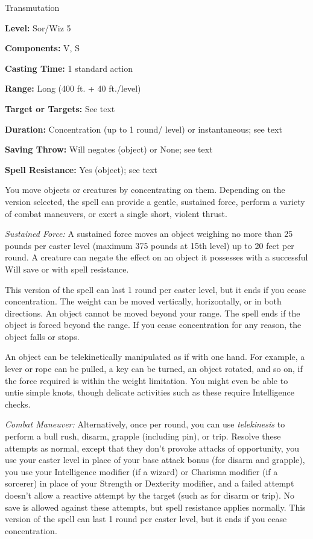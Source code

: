
Transmutation

\textbf{Level:} Sor/Wiz 5

\textbf{Components:} V, S

\textbf{Casting Time:} 1 standard action

\textbf{Range:} Long (400 ft. + 40 ft./level)

\textbf{Target or Targets:} See text

\textbf{Duration:} Concentration (up to 1 round/ level) or instantaneous; see text

\textbf{Saving Throw:} Will negates (object) or None; see text

\textbf{Spell Resistance:} Yes (object); see text

You move objects or creatures by concentrating on them. Depending on the version 
selected, the spell can provide a gentle, sustained force, perform a variety of 
combat maneuvers, or exert a single short, violent thrust.

\textit{Sustained Force:} A sustained force moves an object weighing no more than 
25 pounds per caster level (maximum 375 pounds at 15th level) up to 20 feet per 
round. A creature can negate the effect on an object it possesses with a successful 
Will save or with spell resistance.

This version of the spell can last 1 round per caster level, but it ends if you 
cease concentration. The weight can be moved vertically, horizontally, or in both 
directions. An object cannot be moved beyond your range. The spell ends if the 
object is forced beyond the range. If you cease concentration for any reason, the 
object falls or stops.

An object can be telekinetically manipulated as if with one hand. For example, 
a lever or rope can be pulled, a key can be turned, an object rotated, and so on, 
if the force required is within the weight limitation. You might even be able to 
untie simple knots, though delicate activities such as these require Intelligence 
checks.

\textit{Combat Maneuver:} Alternatively, once per round, you can use \textit{telekinesis 
}to perform a bull rush, disarm, grapple (including pin), or trip. Resolve these 
attempts as normal, except that they don't provoke attacks of opportunity, you 
use your caster level in place of your base attack bonus (for disarm and grapple), 
you use your Intelligence modifier (if a wizard) or Charisma modifier (if a sorcerer) 
in place of your Strength or Dexterity modifier, and a failed attempt doesn't allow 
a reactive attempt by the target (such as for disarm or trip). No save is allowed 
against these attempts, but spell resistance applies normally. This version of 
the spell can last 1 round per caster level, but it ends if you cease concentration.


